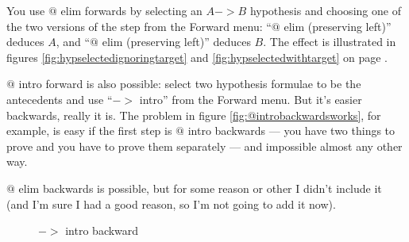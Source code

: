 \documentclass[11pt]{book}
\newcommand{\figref}[1]{figure \ref{fig:#1}}
\begin{document}
You use $@$ elim forwards by selecting an $A->B$ hypothesis and choosing one of the two versions of the step from the Forward menu: ``$@$ elim (preserving left)'' deduces $A$, and ``$@$ elim (preserving left)'' deduces $B$. The effect is illustrated in figures \ref{fig:hypselectedignoringtarget} and \ref{fig:hypselectedwithtarget} on page \pageref{fig:hypselectedignoringtarget}.

$@$ intro forward is also possible: select two hypothesis formulae to be the antecedents and use ``$->$ intro'' from the Forward menu. But it's easier backwards, really it is. The problem in \figref{@introbackwardsworks}, for example, is easy if the first step is $@$ intro backwards --- you have two things to prove and you have to prove them separately --- and impossible almost any other way.

$@$ elim backwards is possible, but for some reason or other I didn't include it (and I'm sure I had a good reason, so I'm not going to add it now).

\begin{figure}
\centering
{}
\qquad
{}
\caption{$->$ intro backward}
\label{fig:arrowintrobackward}
\end{figure}
\end{document}
